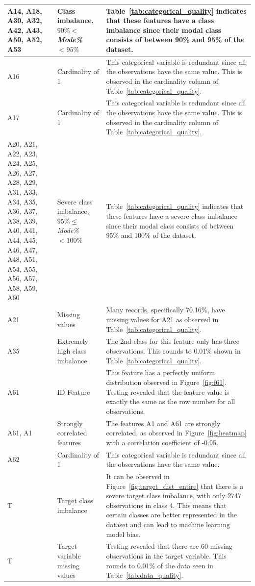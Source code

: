 \documentclass[11pt]{article}
\begin{document}
\begin{longtable}{|p{1.7cm}|p{4cm}|p{8cm}|}
	A14, A18, A30, A32, A42, A43, A50, A52, A53 & Class imbalance, $90\%<$\textit{Mode\%} $< 95\%$ & Table~\ref{tab:categorical_quality} indicates that these features have a class imbalance since their modal class consists of between 90\% and 95\% of the dataset. \\
	\hline
	A16 & Cardinality of 1 & This categorical variable is redundant since all the observations have the same value. This is observed in the cardinality column of Table~\ref{tab:categorical_quality}. \\
	\hline
	A17 & Cardinality of 1 & This categorical variable is redundant since all the observations have the same value. This is observed in the cardinality column of Table~\ref{tab:categorical_quality}. \\
	\hline
	A20, A21, A22, A23, A24, A25, A26, A27, A28, A29, A31, A33, A34, A35, A36, A37, A38, A39, A40, A41, A44, A45, A46, A47, A48, A51, A54, A55, A56, A57, A58, A59, A60 & Severe class imbalance, $95\%\le$\textit{Mode\%} $< 100\%$ & Table~\ref{tab:categorical_quality} indicates that these features have a severe class imbalance since their modal class consists of between 95\% and 100\% of the dataset. \\
	\hline
	A21 & Missing values & Many records, specifically 70.16\%, have missing values for A21 as observed in Table~\ref{tab:categorical_quality}. \\
	\hline
	A35 & Extremely high class imbalance& The 2nd class for this feature only has three observations. This rounds to 0.01\% shown in Table~\ref{tab:categorical_quality}. \\
	\hline
	A61 & ID Feature & This feature has a perfectly uniform distribution observed in Figure~\ref{fig:f61}. Testing revealed that the feature value is exactly the same as the row number for all observations. \\
	\hline
	A61, A1 & Strongly correlated features & The features A1 and A61 are strongly correlated, as observed in Figure~\ref{fig:heatmap} with a correlation coefficient of -0.95. \\
	\hline
	A62 & Cardinality of 1 & This categorical variable is redundant since all the observations have the same value. \\
	\hline
	T & Target class imbalance &  It can be observed in Figure~\ref{fig:target_dist_entire} that there is a severe target class imbalance, with only 2747 observations in class 4.  This means that certain classes are better represented in the dataset and can lead to machine learning model bias. \\
	\hline
	T & Target variable missing values & Testing revealed that there are 60 missing observations in the target variable. This rounds to 0.01\% of the data seen in Table~\ref{tab:data_quality}.\\
	\hline
\end{longtable}
\end{document}
